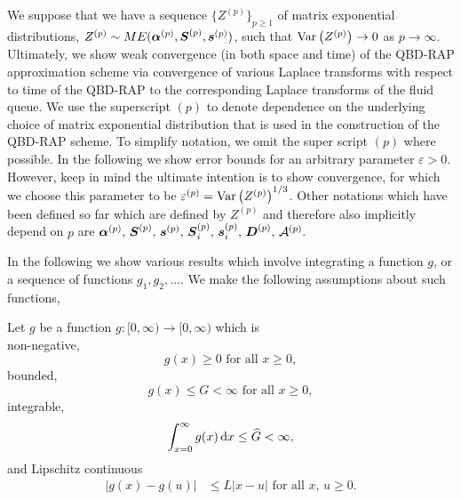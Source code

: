 We suppose that we have a sequence \(\{Z^{(p)}\}_{p\geq 1}\) of matrix exponential distributions, \(Z^{(p)}\sim ME(\boldsymbol\alpha^{(p)},\boldsymbol S^{(p)}, \boldsymbol s^{(p)})\), such that \(\mathrm{Var}\left(Z^{(p)}\right)\to 0 \) as \(p\to \infty\). Ultimately, we show weak convergence (in both space and time) of the QBD-RAP approximation scheme via convergence of various Laplace transforms with respect to time of the QBD-RAP to the corresponding Laplace transforms of the fluid queue. We use the superscript \((p)\) to denote dependence on the underlying choice of matrix exponential distribution that is used in the construction of the QBD-RAP scheme. To simplify notation, we omit the super script \((p)\) where possible. In the following we show error bounds for an arbitrary parameter \(\varepsilon>0\). However, keep in mind the ultimate intention is to show convergence, for which we choose this parameter to be \(\varepsilon^{(p)}=\mathrm{Var}\left(Z^{(p)}\right)^{1/3}\). Other notations which have been defined so far which are defined by \(Z^{(p)}\) and therefore also implicitly depend on \(p\) are \(\boldsymbol\alpha^{(p)},\,\boldsymbol S^{(p)},\,\boldsymbol s^{(p)},\, \boldsymbol S_i^{(p)},\, \boldsymbol s_i^{(p)},\, \boldsymbol D^{(p)},\,\mathcal A^{(p)}.\)

In the following we show various results which involve integrating a function \(g\), or a sequence of functions \(g_1,g_2,\dots\). We make the following assumptions about such functions, 
\begin{asu}\label{asu: g}
	Let \(g\) be a function \(g:[0,\infty)\to [0,\infty)\) which is \\
	\subasu \label{asu: g non-neg} non-negative, 
	\[g(x) \geq 0 \mbox{ for all } x \geq 0,\]
	\subasu bounded, 
	\[g(x) \leq G < \infty \mbox{ for all } x \geq 0,\]
	\subasu integrable, 
	\[\int_{x=0}^\infty g(x)\, \mathrm{d} x \leq \widehat G < \infty,\]
	\subasu \label{asu: lipschitz} and Lipschitz continuous 
	\begin{align}
		|g(x) - g(u)|&\leq L|x - u| \mbox{ for all } x,\, u \geq 0.
	\end{align}
\end{asu}

